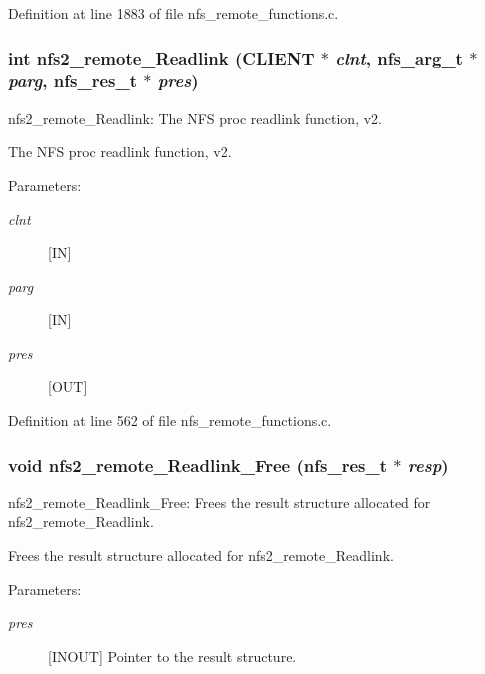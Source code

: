 Definition at line 1883 of file nfs\_\-remote\_\-functions.c.
\subsubsection[{nfs2\_\-remote\_\-Readlink}]{\setlength{\rightskip}{0pt plus 5cm}int nfs2\_\-remote\_\-Readlink (CLIENT $\ast$ {\em clnt}, \/  nfs\_\-arg\_\-t $\ast$ {\em parg}, \/  nfs\_\-res\_\-t $\ast$ {\em pres})}\label{group__NFSprocs_g952a91aff786a5ceb1565469ca8fbc05}


nfs2\_\-remote\_\-Readlink: The NFS proc readlink function, v2.

The NFS proc readlink function, v2.

\begin{Desc}
\item[Parameters:]
\begin{description}
\item[{\em clnt}][IN] \item[{\em parg}][IN] \item[{\em pres}][OUT] \end{description}
\end{Desc}


Definition at line 562 of file nfs\_\-remote\_\-functions.c.
\subsubsection[{nfs2\_\-remote\_\-Readlink\_\-Free}]{\setlength{\rightskip}{0pt plus 5cm}void nfs2\_\-remote\_\-Readlink\_\-Free (nfs\_\-res\_\-t $\ast$ {\em resp})}\label{group__NFSprocs_gd49a28a741852134cf6219851176e40c}


nfs2\_\-remote\_\-Readlink\_\-Free: Frees the result structure allocated for nfs2\_\-remote\_\-Readlink.

Frees the result structure allocated for nfs2\_\-remote\_\-Readlink.

\begin{Desc}
\item[Parameters:]
\begin{description}
\item[{\em pres}][INOUT] Pointer to the result structure. \end{description}
\end{Desc}


